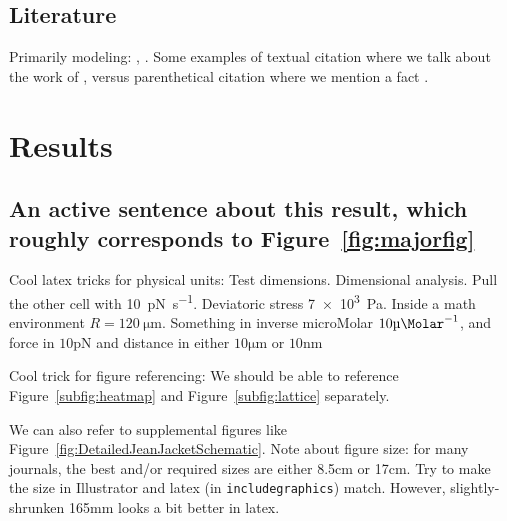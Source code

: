 \documentclass[onecolumn,11pt]{article}
\newcommand{\uM}{\si{\micro\Molar}}
\newcommand{\um}{\si{\micro\metre}}
\newcommand{\pN}{\si{\pico\newton}}
\newcommand{\nm}{\si{\nano\metre}}
\begin{document}
\subsection*{Literature}
Primarily modeling: \citet{Miller.2018}, \citet{Wilhelm.2003}. 
Some examples of textual citation where we talk about the work of \citet{Miller.2018}, versus parenthetical citation where we mention a fact \cite{Miller.2018}. 


\clearpage %
\section*{Results} 


\subsection*{An active sentence about this result, which roughly corresponds to Figure~\ref{fig:majorfig}} 


Cool latex tricks for physical units: Test dimensions. 
Dimensional analysis. Pull the other cell with \SI{10}{\pico\newton\per\second}. Deviatoric stress \SI{7e3}{\pascal}. Inside a math environment $R=\SI{120}{\micro\meter}$. 
Something in inverse microMolar $10\uM^{-1}$, and force in $10\pN$ and distance in either $10\um$ or $10\nm$

Cool trick for figure referencing: We should be able to reference Figure~\ref{subfig:heatmap} and Figure~\ref{subfig:lattice} separately.

We can also refer to supplemental figures like Figure~\ref{fig:DetailedJeanJacketSchematic}.
Note about figure size: for many journals, the best and/or required sizes are either 8.5cm or 17cm.
Try to make the size in Illustrator and latex (in \verb|includegraphics|) match. 
However, slightly-shrunken 165mm looks a bit better in latex.
\end{document}
